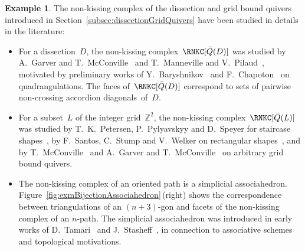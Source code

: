 \documentclass{memo-l}
\theoremstyle{definition}
\newtheorem{example}[theorem]{Example}
\newcommand{\Z}{\mathbb{Z}} %
\newcommand{\fref}[1]{Figure~\ref{#1}} %
\begin{document}
\begin{example}
The non-kissing complex of the dissection and grid bound quivers introduced in Section~\ref{subsec:dissectionGridQuivers} have been studied in details in the literature:
\begin{itemize}
\item For a dissection~$D$, the non-kissing complex~$\RNKC[\bar Q(D)]$ was studied by A.~Garver and T.~McConville~\cite{GarverMcConville} and T.~Manneville and V.~Pilaud~\cite{MannevillePilaud-accordion}, motivated by preliminary works of Y.~Baryshnikov~\cite{Baryshnikov} and F.~Chapoton~\cite{Chapoton-quadrangulations} on quadrangulations. The faces of~$\RNKC[\bar Q(D)]$ correspond to sets of pairwise non-crossing accordion diagonals~of~$D$.
\item For a subset~$L$ of the integer grid~$\Z^2$, the non-kissing complex~$\RNKC[\bar Q(L)]$ was studied by T.~K.~Petersen, P.~Pylyavskyy and D.~Speyer for staircase shapes~\cite{PetersenPylyavskyySpeyer}, by F.~Santos, C.~Stump and V.~Welker on rectangular shapes~\cite{SantosStumpWelker}, and by T.~McConville~\cite{McConville} and A.~Garver and T.~McConville~\cite{GarverMcConville-grid} on arbitrary grid bound quivers. %
\item The non-kissing complex of an oriented path is a simplicial associahedron. \fref{fig:exmBijectionAssociahedron}\,(right) shows the correspondence between triangulations of an $(n+3)$-gon and facets of the non-kissing complex of an $n$-path. The simplicial associahedron was introduced in early works of D.~Tamari~\cite{Tamari} and J.~Stasheff~\cite{Stasheff}, in connection to associative schemes and topological motivations.
\end{itemize}
\end{example}
\end{document}
